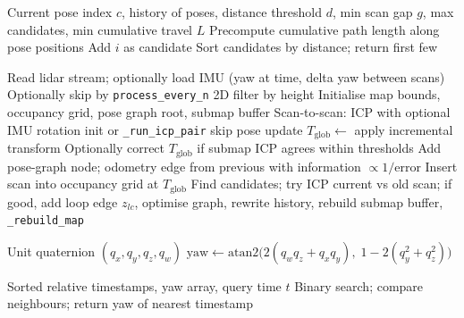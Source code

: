 \documentclass[11pt,a4paper]{article}
\begin{document}
\begin{algorithm}
\caption{Loop-closure candidate selection (\texttt{\_find\_loop\_candidates})}
\begin{algorithmic}[1]
\Require Current pose index $c$, history of poses, distance threshold $d$, min scan gap $g$, max candidates, min cumulative travel $L$
\State Precompute cumulative path length along pose positions
        \State Add $i$ as candidate
    \EndIf
\EndFor
\State Sort candidates by distance; return first few
\end{algorithmic}
\end{algorithm}

\begin{algorithm}
\caption{Main online SLAM loop (high level)}
\begin{algorithmic}[1]
\State Read lidar stream; optionally load IMU (yaw at time, delta yaw between scans)
    \State Optionally skip by \texttt{process\_every\_n}
    \State 2D filter by height
        \State Initialise map bounds, occupancy grid, pose graph root, submap buffer
    \Else
        \State Scan-to-scan: ICP with optional IMU rotation init or \texttt{\_run\_icp\_pair}
         skip pose update \EndIf
        \State $T_{\mathrm{glob}} \gets$ apply incremental transform
            \State Optionally correct $T_{\mathrm{glob}}$ if submap ICP agrees within thresholds
        \EndIf
        \State Add pose-graph node; odometry edge from previous with information $\propto 1/\text{error}$
        \State Insert scan into occupancy grid at $T_{\mathrm{glob}}$
            \State Find candidates; try ICP current vs old scan; if good, add loop edge $z_{lc}$, optimise graph, rewrite history, rebuild submap buffer, \texttt{\_rebuild\_map}
        \EndIf
    \EndIf
\EndFor
\end{algorithmic}
\end{algorithm}

\begin{algorithm}
\caption{IMU yaw from quaternion (\texttt{\_quat\_to\_yaw})}
\begin{algorithmic}[1]
\Require Unit quaternion $(q_x,q_y,q_z,q_w)$
\State $\mathrm{yaw} \gets \mathrm{atan2}\bigl(2(q_w q_z + q_x q_y),\; 1 - 2(q_y^2 + q_z^2)\bigr)$
\end{algorithmic}
\end{algorithm}

\begin{algorithm}
\caption{IMU yaw lookup (\texttt{IMUService.yaw\_at})}
\begin{algorithmic}[1]
\Require Sorted relative timestamps, yaw array, query time $t$
\State Binary search; compare neighbours; return yaw of nearest timestamp
\end{algorithmic}
\end{algorithm}
\end{document}
